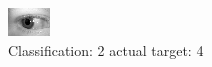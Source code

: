\begin{figure}[h!]
\begin{center}
\includegraphics[width=0.60\columnwidth]{figures/ID815_class_2_target_4.png}
\end{center}
\caption{ Classification: 2 actual target: 4}
\label{fig:ID815_class_2_target_4}
\end{figure}
